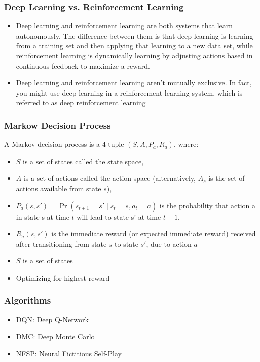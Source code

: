 \begin{frame}
    \frametitle{Deep Learning vs. Reinforcement Learning}

    \begin{itemize}
        \item Deep learning and reinforcement learning are both systems that learn autonomously. The difference between them is that deep learning is learning from a training set and then applying that learning to a new data set, while reinforcement learning is dynamically learning by adjusting actions based in continuous feedback to maximize a reward.
        \item Deep learning and reinforcement learning aren’t mutually exclusive. In fact, you might use deep learning in a reinforcement learning system, which is referred to as deep reinforcement learning
    \end{itemize}
\end{frame}

\begin{frame}
    \frametitle{Markow Decision Process}
    A Markov decision process is a 4-tuple $(S,A,P_{a},R_{a})$, where:

    \begin{itemize}
        \item $S$ is a set of states called the state space,
        \item $A$ is a set of actions called the action space (alternatively, $A_s$ is the set of actions available from state $s$),
        \item $P_{a}(s,s')=\Pr(s_{t+1}=s'\mid s_{t}=s,a_{t}=a)$ is the probability that action a in state s at time $t$ will lead to state s' at time $t+1$,
        \item $R_{a}(s,s')$ is the immediate reward (or expected immediate reward) received after transitioning from state $s$ to state $s'$, due to action $a$
        \item $S$ is a set of states
    \end{itemize}

    \begin{itemize}
        \item Optimizing for highest reward

    \end{itemize}
\end{frame}

\begin{frame}
    \frametitle{Algorithms}

    \begin{itemize}
        \item{DQN: Deep Q-Network}
        \item{DMC: Deep Monte Carlo}
        \item{NFSP: Neural Fictitious Self-Play}
    \end{itemize}
\end{frame}
